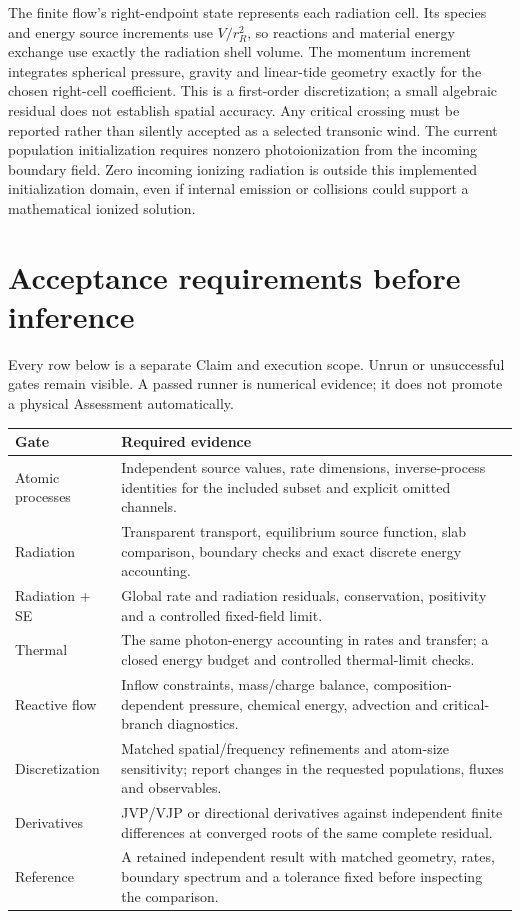 \documentclass[11pt,a4paper]{article}
\begin{document}
The finite flow's right-endpoint state represents each radiation cell. Its
species and energy source increments use $V/r_R^2$, so reactions and material
energy exchange use exactly the radiation shell volume. The momentum increment
integrates spherical pressure, gravity and linear-tide geometry exactly for
the chosen right-cell coefficient. This is a first-order discretization; a small
algebraic residual does not establish spatial accuracy. Any critical crossing
must be reported rather than silently accepted as a selected transonic wind.
The current population initialization requires nonzero photoionization from
the incoming boundary field. Zero incoming ionizing radiation is outside this
implemented initialization domain, even if internal emission or collisions
could support a mathematical ionized solution.

\section{Acceptance requirements before inference}
Every row below is a separate Claim and execution scope. Unrun or unsuccessful
gates remain visible. A passed runner is numerical evidence; it does not
promote a physical Assessment automatically.
\begin{center}
\begin{tabular}{@{}p{}p{}@{}}
\toprule
Gate & Required evidence\\
\midrule
Atomic processes & Independent source values, rate dimensions, inverse-process
identities for the included subset and explicit omitted channels.\\
Radiation & Transparent transport, equilibrium source function, slab comparison,
boundary checks and exact discrete energy accounting.\\
Radiation + SE & Global rate and radiation residuals, conservation, positivity
and a controlled fixed-field limit.\\
Thermal & The same photon-energy accounting in rates and transfer; a closed
energy budget and controlled thermal-limit checks.\\
Reactive flow & Inflow constraints, mass/charge balance, composition-dependent
pressure, chemical energy, advection and critical-branch diagnostics.\\
Discretization & Matched spatial/frequency refinements and atom-size sensitivity;
report changes in the requested populations, fluxes and observables.\\
Derivatives & JVP/VJP or directional derivatives against independent finite
differences at converged roots of the same complete residual.\\
Reference & A retained independent result with matched geometry, rates, boundary
spectrum and a tolerance fixed before inspecting the comparison.\\
\bottomrule
\end{tabular}
\end{center}
\end{document}
